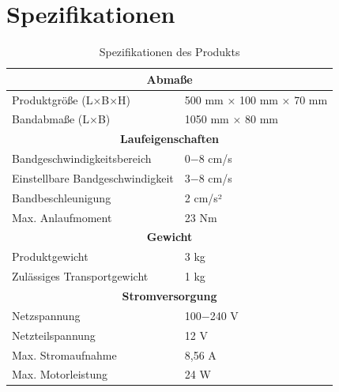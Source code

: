 %
%

\chapter{Spezifikationen}
\label{sec:Spezifikationen}

\begin{table}[]
	\begin{center}
	\caption{Spezifikationen des Produkts}
	\begin{tabular}{|ll|}
		\hline
		\multicolumn{2}{|c|}{\textbf{Abmaße}}                        		              	\\ \hline
		\multicolumn{1}{|l|}{Produktgröße (L×B×H)}        		& 500 mm × 100 mm × 70 mm 	\\ \hline
		\multicolumn{1}{|l|}{Bandabmaße (L×B)}            		& 1050 mm × 80 mm         	\\ \hline
		\multicolumn{2}{|c|}{\textbf{Laufeigenschaften}}									\\ \hline
		\multicolumn{1}{|l|}{Bandgeschwindigkeitsbereich} 		& 0$-$8 cm/s          		\\ \hline
		\multicolumn{1}{|l|}{Einstellbare Bandgeschwindigkeit}  & 3$-$8 cm/s          		\\ \hline
		\multicolumn{1}{|l|}{Bandbeschleunigung}         		& 2 cm/s²                 	\\ \hline
		\multicolumn{1}{|l|}{Max. Anlaufmoment}           		& 23 Nm                   	\\ \hline
		\multicolumn{2}{|c|}{\textbf{Gewicht}}                                      		\\ \hline
		\multicolumn{1}{|l|}{Produktgewicht}              		& 3 kg                    	\\ \hline
		\multicolumn{1}{|l|}{Zulässiges Transportgewicht} 		& 1 kg                    	\\ \hline
		\multicolumn{2}{|c|}{\textbf{Stromversorgung}}                              		\\ \hline
		\multicolumn{1}{|l|}{Netzspannung}                		& 100$-$240 V               	\\ \hline
		\multicolumn{1}{|l|}{Netzteilspannung}           		& 12 V                    	\\ \hline
		\multicolumn{1}{|l|}{Max. Stromaufnahme}          		& 8,56 A                  	\\ \hline
		\multicolumn{1}{|l|}{Max. Motorleistung}          		& 24 W                    	\\ \hline
	\end{tabular}
	\end{center}
\end{table}




